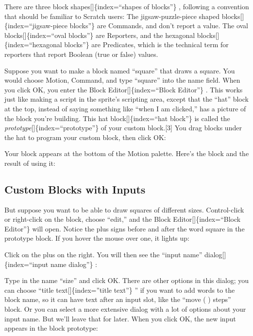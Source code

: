 \documentclass[
  letterpaper,
]{book}
\begin{document}
There are three block shapes{[}{]}\{index=``shapes of blocks''\} ,
following a convention that should be familiar to Scratch users: The
jigsaw-puzzle-piece shaped blocks{[}{]}\{index=``jigsaw-piece blocks''\}
are Commands, and don't report a value. The oval
blocks{[}{]}\{index=``oval blocks''\} are Reporters, and the hexagonal
blocks{[}{]}\{index=``hexagonal blocks''\} are Predicates, which is the
technical term for reporters that report Boolean (true or false) values.

Suppose you want to make a block named ``square'' that draws a square.
You would choose Motion, Command, and type ``square'' into the name
field. When you click OK, you enter the Block
Editor{[}{]}\{index=``Block Editor''\} . This works just like making a
script in the sprite's scripting area, except that the ``hat'' block at
the top, instead of saying something like ``when I am clicked,'' has a
picture of the block you're building. This hat block{[}{]}\{index=``hat
block''\} is called the \emph{prototype}{[}{]}\{index=``prototype''\} of
your custom block.{[}3{]} You drag blocks under the hat to program your
custom block, then click OK:

Your block appears at the bottom of the Motion palette. Here's the block
and the result of using it:

\subsection{Custom Blocks with Inputs}\label{custom-blocks-with-inputs}

But suppose you want to be able to draw squares of different sizes.
Control-click or right-click on the block, choose ``edit,'' and the
Block Editor{[}{]}\{index=``Block Editor''\} will open. Notice the plus
signs before and after the word square in the prototype block. If you
hover the mouse over one, it lights up:

Click on the plus on the right. You will then see the ``input name''
dialog{[}{]}\{index=``input name dialog''\} :

Type in the name ``size'' and click OK. There are other options in this
dialog; you can choose ``title text{[}{]}\{index=''title text''\} '' if
you want to add words to the block name, so it can have text after an
input slot, like the ``move ( ) steps'' block. Or you can select a more
extensive dialog with a lot of options about your input name. But we'll
leave that for later. When you click OK, the new input appears in the
block prototype:
\end{document}
